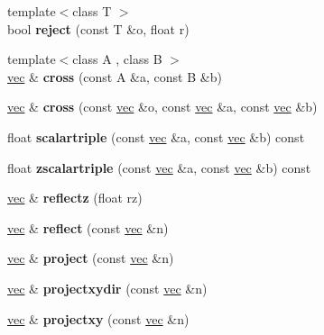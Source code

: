 \begin{DoxyCompactItemize}
{\footnotesize template$<$class T $>$ }\\bool {\bfseries reject} (const T \&o, float r)
\item 
\mbox{\label{structvec_a0a23b52abf4a941d06d6842f395dd11e}} 
{\footnotesize template$<$class A , class B $>$ }\\\hyperlink{structvec}{vec} \& {\bfseries cross} (const A \&a, const B \&b)
\item 
\mbox{\label{structvec_abd6cd39054af166b53189d569f135669}} 
\hyperlink{structvec}{vec} \& {\bfseries cross} (const \hyperlink{structvec}{vec} \&o, const \hyperlink{structvec}{vec} \&a, const \hyperlink{structvec}{vec} \&b)
\item 
\mbox{\label{structvec_a7569fdf206ec0be0beb74d8f4a21961c}} 
float {\bfseries scalartriple} (const \hyperlink{structvec}{vec} \&a, const \hyperlink{structvec}{vec} \&b) const
\item 
\mbox{\label{structvec_aee78b052971467b1b3d0c2bed8dba8a4}} 
float {\bfseries zscalartriple} (const \hyperlink{structvec}{vec} \&a, const \hyperlink{structvec}{vec} \&b) const
\item 
\mbox{\label{structvec_ae924e2c682a16ec0c7e27837d78242fa}} 
\hyperlink{structvec}{vec} \& {\bfseries reflectz} (float rz)
\item 
\mbox{\label{structvec_a22910494b71a6572edbadff92b539dc5}} 
\hyperlink{structvec}{vec} \& {\bfseries reflect} (const \hyperlink{structvec}{vec} \&n)
\item 
\mbox{\label{structvec_a420cc838550f5667b8d3f82372878fa5}} 
\hyperlink{structvec}{vec} \& {\bfseries project} (const \hyperlink{structvec}{vec} \&n)
\item 
\mbox{\label{structvec_aa1a18812cb6a17374f2b9ac689cf25d8}} 
\hyperlink{structvec}{vec} \& {\bfseries projectxydir} (const \hyperlink{structvec}{vec} \&n)
\item 
\mbox{\label{structvec_ad209ceb35bd360f85e7b37062bb50554}} 
\hyperlink{structvec}{vec} \& {\bfseries projectxy} (const \hyperlink{structvec}{vec} \&n)
\item 

\end{DoxyCompactItemize}
